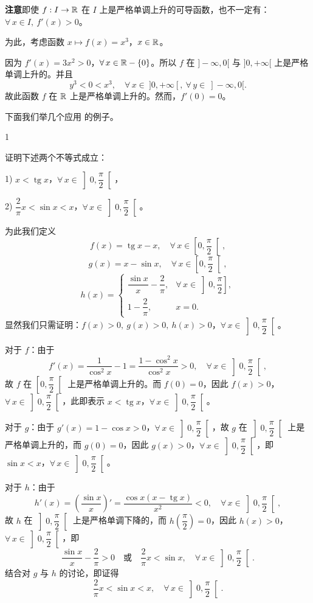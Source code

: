 \textbf{注意}\quad 即使 \(f:I\to\mathbb{R}\) 在 \(I\) 上是严格单调上升的可导函数，也不一定有：\(\forall\,x\in I,\ f'(x)>0\)。

为此，考虑函数 \(x\longmapsto f(x)=x^3\)，\(x\in\mathbb{R}\)。

因为 \(f'(x)=3x^2>0\)，\(\forall\,x\in\mathbb{R}-\{0\}\)。所以 \(f\) 在 \(]-\infty,0[\) 与 \(]0,+\infty[\) 上是严格单调上升的。并且
\[
y^3<0<x^3,\quad\forall\,x\in\ ]0,+\infty[,\ \forall\,y\in\ ]-\infty,0[.
\]
故此函数 \(f\) 在 \(\mathbb{R}\) 上是严格单调上升的。然而，\(f'(0)=0\)。

下面我们举几个应用 的例子。

\begin{sourceexample}{1}

	证明下述两个不等式成立：

	1) \(x<\operatorname{tg}x\)，\(\forall\,x\in\left]0,\dfrac\pi2\right[\)，

	2) \(\dfrac2\pi x<\sin x<x\)，\(\forall\,x\in\left]0,\dfrac\pi2\right[\)。

	为此我们定义
	\[
	f(x)=\operatorname{tg}x-x,\quad\forall\,x\in\left[0,\frac\pi2\right[,
	\]
	\[
	g(x)=x-\sin x,\quad\forall\,x\in\left[0,\frac\pi2\right[,
	\]
	\[
	h(x)=\begin{cases} \dfrac{\sin x}{x}-\dfrac2\pi, & \forall\,x\in\left]0,\dfrac\pi2\right], \\[6pt] 1-\dfrac2\pi, & x=0. \end{cases}
	\]
	显然我们只需证明：\(f(x)>0,\ g(x)>0,\ h(x)>0\)，\(\forall\,x\in\left]0,\dfrac\pi2\right[\)。

	对于 \(f\)：由于
	\[
	f'(x)=\frac1{\cos^2x}-1=\frac{1-\cos^2x}{\cos^2x}>0,\quad\forall\,x\in\left]0,\frac\pi2\right[,
	\]
	故 \(f\) 在 \(\left[0,\dfrac\pi2\right[\) 上是严格单调上升的。而 \(f(0)=0\)，因此 \(f(x)>0\)，\(\forall\,x\in\left]0,\dfrac\pi2\right[\)，此即表示 \(x<\operatorname{tg}x\)，\(\forall\,x\in\left]0,\dfrac\pi2\right[\)。

	对于 \(g\)：由于 \(g'(x)=1-\cos x>0\)，\(\forall\,x\in\left]0,\dfrac\pi2\right[\)，故 \(g\) 在 \(\left]0,\dfrac\pi2\right[\) 上是严格单调上升的，而 \(g(0)=0\)，因此 \(g(x)>0\)，\(\forall\,x\in\left]0,\dfrac\pi2\right[\)，即 \(\sin x<x\)，\(\forall\,x\in\left]0,\dfrac\pi2\right[\)。

	对于 \(h\)：由于
	\[
	h'(x)=\left(\frac{\sin x}{x}\right)'=\frac{\cos x(x-\operatorname{tg}x)}{x^2}<0,\quad\forall\,x\in\left]0,\frac\pi2\right[,
	\]
	故 \(h\) 在 \(\left]0,\dfrac\pi2\right[\) 上是严格单调下降的，而 \(h\left(\dfrac\pi2\right)=0\)，因此 \(h(x)>0\)，\(\forall\,x\in\left]0,\dfrac\pi2\right[\)，即
	\[
	\frac{\sin x}{x}-\frac2\pi>0\quad\text{或}\quad\frac2\pi x<\sin x,\quad\forall\,x\in\left]0,\frac\pi2\right[.
	\]
	结合对 \(g\) 与 \(h\) 的讨论，即证得
	\[
	\frac2\pi x<\sin x<x,\quad\forall\,x\in\left]0,\frac\pi2\right[.
	\]

\end{sourceexample}

